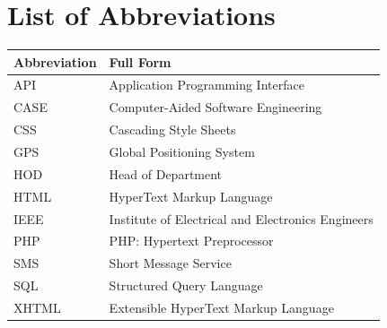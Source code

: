 \chapter*{\hfill List of Abbreviations\hfill\mbox{}}

\begin{center}
\begingroup\singlespacing
\renewcommand{\arraystretch}{1.3}
\begin{tabular}{|>{\raggedright\arraybackslash}p{2.8cm}|>{\raggedright\arraybackslash}p{11cm}|}
\hline
\textbf{Abbreviation} & \textbf{Full Form}\\ \hline
API & Application Programming Interface\\ \hline
CASE & Computer-Aided Software Engineering\\ \hline
CSS & Cascading Style Sheets\\ \hline
GPS & Global Positioning System\\ \hline
HOD & Head of Department\\ \hline
HTML & HyperText Markup Language\\ \hline
IEEE & Institute of Electrical and Electronics Engineers\\ \hline
PHP & PHP: Hypertext Preprocessor\\ \hline
SMS & Short Message Service\\ \hline
SQL & Structured Query Language\\ \hline
XHTML & Extensible HyperText Markup Language\\ \hline
\end{tabular}
\endgroup
\end{center}
